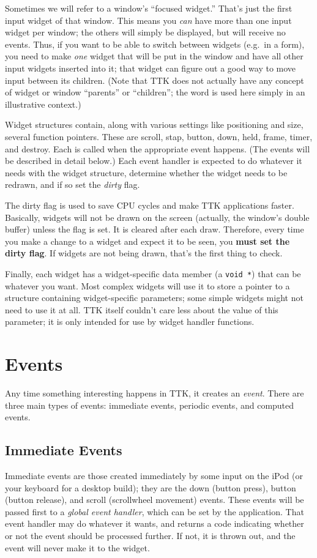 \documentclass[12pt,letterpaper]{report}
\let\ttt\tt
\def\tt{\def\_{{\ttt\char`\_}}\ttt}
\begin{document}
Sometimes we will refer to a window's ``focused widget.'' That's just the first
input widget of that window. This means you \emph{can} have more than one input
widget per window; the others will simply be displayed, but will receive no events.
Thus, if you want to be able to switch between widgets (e.g.~in a form), you need
to make \emph{one} widget that will be put in the window and have all other input
widgets inserted into it; that widget can figure out a good way to move input
between its children. (Note that TTK does not actually have any concept of 
widget or window ``parents'' or ``children''; the word is used here simply in an
illustrative context.)

Widget structures contain, along with various settings like positioning and size,
several function pointers. These are {\sf scroll}, {\sf stap}, {\sf button},
{\sf down}, {\sf held}, {\sf frame}, {\sf timer}, and {\sf destroy}. Each is called when
the appropriate event happens. (The events will be described in detail below.) Each event
handler is expected to do whatever it needs with the widget structure, determine whether
the widget needs to be redrawn, and if so set the {\sl dirty} flag.

The {\sf dirty} flag is used to save CPU cycles and make TTK applications faster. Basically,
widgets will not be drawn on the screen (actually, the window's double buffer) unless
the flag is set. It is cleared after each draw. Therefore, every time you make a change
to a widget and expect it to be seen, you \textbf{must set the \textsf{dirty} flag}. If widgets are
not being drawn, that's the first thing to check.

Finally, each widget has a widget-specific {\sf data} member (a {\tt void *}) that can be whatever
you want. Most complex widgets will use it to store a pointer to a structure containing widget-specific
parameters; some simple widgets might not need to use it at all. TTK itself couldn't care less about
the value of this parameter; it is only intended for use by widget handler functions.

\section{Events}
Any time something interesting happens in TTK, it creates an {\sl event}. There are three main
types of events: immediate events, periodic events, and computed events.

\subsection{Immediate Events}
Immediate events are those created immediately by some input on the iPod (or your keyboard for a desktop
build); they are the {\sf down} (button press), {\sf button} (button release), and {\sf scroll}
(scrollwheel movement) events. These events will be
passed first to a {\sl global event handler}, which can be set by the application. That event handler
may do whatever it wants, and returns a code indicating whether or not the event should be processed further.
If not, it is thrown out, and the event will never make it to the widget.
\end{document}
